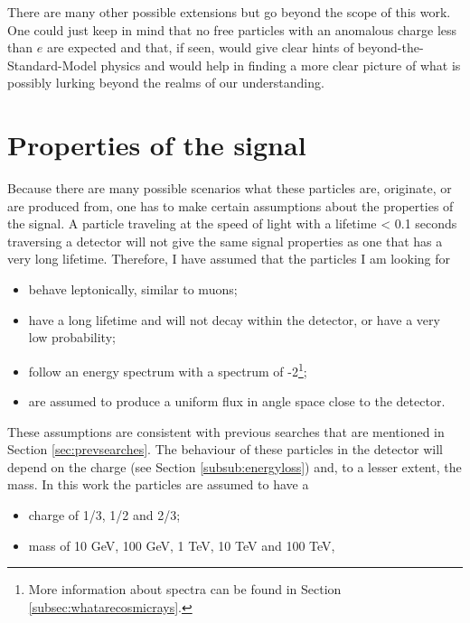 There are many other possible extensions but go beyond the scope of this work. One could just keep in mind that no free particles with an anomalous charge less than $e$ are expected and that, if seen, would give clear hints of beyond-the-Standard-Model physics and would help in finding a more clear picture of what is possibly lurking beyond the realms of our understanding.



\section{Properties of the signal}
\label{sec:properties}
Because there are many possible scenarios what these particles are, originate, or are produced from, one has to make certain assumptions about the properties of the signal. A particle traveling at the speed of light with a lifetime < 0.1 seconds traversing a detector will not give the same signal properties as one that has a very long lifetime. Therefore, I have assumed that the particles I am looking for

\begin{itemize}
\item behave leptonically, similar to muons;
\item have a long lifetime and will not decay within the detector, or have a very low probability;
\item follow an energy spectrum with a spectrum of -2\footnote{More information about spectra can be found in Section \ref{subsec:whatarecosmicrays}.};
\item are assumed to produce a uniform flux in angle space close to the detector.
\end{itemize}
These assumptions are consistent with previous searches that are mentioned in Section \ref{sec:prevsearches}. The behaviour of these particles in the detector will depend on the charge (see Section \ref{subsub:energyloss}) and, to a lesser extent, the mass. In this work the particles are assumed to have a

\begin{itemize}
\item charge of 1/3, 1/2 and 2/3;
\item mass of 10 GeV, 100 GeV, 1 TeV, 10 TeV and 100 TeV,
\end{itemize}


